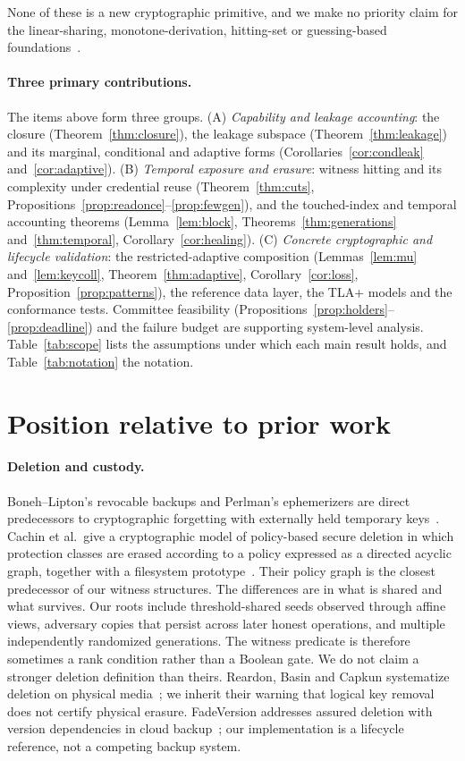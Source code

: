 \documentclass[pdflatex,sn-mathphys-num,twocolumn]{sn-jnl}
\theoremstyle{plain}
\theoremstyle{definition}
\begin{document}
None of these is a new cryptographic primitive, and we make no priority claim for the linear-sharing, monotone-derivation, hitting-set or guessing-based foundations~\cite{karchmer1993,panjwani2007}.

\paragraph{Three primary contributions.}
The items above form three groups. (A) \emph{Capability and leakage accounting}: the closure (Theorem~\ref{thm:closure}), the leakage subspace (Theorem~\ref{thm:leakage}) and its marginal, conditional and adaptive forms (Corollaries~\ref{cor:condleak} and~\ref{cor:adaptive}). (B) \emph{Temporal exposure and erasure}: witness hitting and its complexity under credential reuse (Theorem~\ref{thm:cuts}, Propositions~\ref{prop:readonce}--\ref{prop:fewgen}), and the touched-index and temporal accounting theorems (Lemma~\ref{lem:block}, Theorems~\ref{thm:generations} and~\ref{thm:temporal}, Corollary~\ref{cor:healing}). (C) \emph{Concrete cryptographic and lifecycle validation}: the restricted-adaptive composition (Lemmas~\ref{lem:mu} and~\ref{lem:keycoll}, Theorem~\ref{thm:adaptive}, Corollary~\ref{cor:loss}, Proposition~\ref{prop:patterns}), the reference data layer, the TLA+ models and the conformance tests. Committee feasibility (Propositions~\ref{prop:holders}--\ref{prop:deadline}) and the failure budget are supporting system-level analysis. Table~\ref{tab:scope} lists the assumptions under which each main result holds, and Table~\ref{tab:notation} the notation.

\section{Position relative to prior work}\label{sec:related}

\paragraph{Deletion and custody.}
Boneh--Lipton's revocable backups and Perlman's ephemerizers are direct predecessors to cryptographic forgetting with externally held temporary keys~\cite{boneh1996,perlman2007}. Cachin et al.\ give a cryptographic model of policy-based secure deletion in which protection classes are erased according to a policy expressed as a directed acyclic graph, together with a filesystem prototype~\cite{cachin2013}. Their policy graph is the closest predecessor of our witness structures. The differences are in what is shared and what survives. Our roots include threshold-shared seeds observed through affine views, adversary copies that persist across later honest operations, and multiple independently randomized generations. The witness predicate is therefore sometimes a rank condition rather than a Boolean gate. We do not claim a stronger deletion definition than theirs. Reardon, Basin and Capkun systematize deletion on physical media~\cite{reardon2013}; we inherit their warning that logical key removal does not certify physical erasure. FadeVersion addresses assured deletion with version dependencies in cloud backup~\cite{rahumed2011}; our implementation is a lifecycle reference, not a competing backup system.
\end{document}
